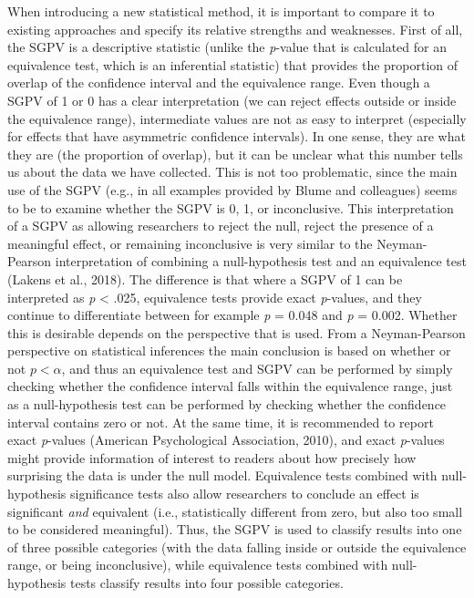 \documentclass[,man,floatsintext]{apa6}
\begin{document}
When introducing a new statistical method, it is important to compare it to existing approaches and specify its relative strengths and weaknesses. First of all, the SGPV is a descriptive statistic (unlike the \emph{p}-value that is calculated for an equivalence test, which is an inferential statistic) that provides the proportion of overlap of the confidence interval and the equivalence range. Even though a SGPV of 1 or 0 has a clear interpretation (we can reject effects outside or inside the equivalence range), intermediate values are not as easy to interpret (especially for effects that have asymmetric confidence intervals). In one sense, they are what they are (the proportion of overlap), but it can be unclear what this number tells us about the data we have collected. This is not too problematic, since the main use of the SGPV (e.g., in all examples provided by Blume and colleagues) seems to be to examine whether the SGPV is 0, 1, or inconclusive. This interpretation of a SGPV as allowing researchers to reject the null, reject the presence of a meaningful effect, or remaining inconclusive is very similar to the Neyman-Pearson interpretation of combining a null-hypothesis test and an equivalence test (Lakens et al., 2018). The difference is that where a SGPV of 1 can be interpreted as \emph{p} \textless{} .025, equivalence tests provide exact \emph{p}-values, and they continue to differentiate between for example \emph{p} = 0.048 and \emph{p} = 0.002. Whether this is desirable depends on the perspective that is used. From a Neyman-Pearson perspective on statistical inferences the main conclusion is based on whether or not \(p < \alpha\), and thus an equivalence test and SGPV can be performed by simply checking whether the confidence interval falls within the equivalence range, just as a null-hypothesis test can be performed by checking whether the confidence interval contains zero or not. At the same time, it is recommended to report exact \emph{p}-values (American Psychological Association, 2010), and exact \emph{p}-values might provide information of interest to readers about how precisely how surprising the data is under the null model. Equivalence tests combined with null-hypothesis significance tests also allow researchers to conclude an effect is significant \emph{and} equivalent (i.e., statistically different from zero, but also too small to be considered meaningful). Thus, the SGPV is used to classify results into one of three possible categories (with the data falling inside or outside the equivalence range, or being inconclusive), while equivalence tests combined with null-hypothesis tests classify results into four possible categories.
\end{document}
